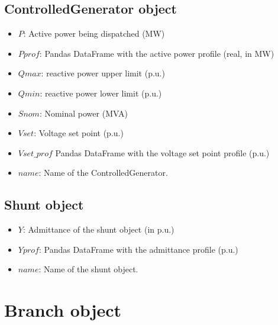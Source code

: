 \documentclass[11pt,fleqn]{book} %
\begin{document}
\subsection{ControlledGenerator object}

\begin{itemize}
	\item $P$: Active power being dispatched (MW)
	\item $Pprof$: Pandas DataFrame with the active power profile (real, in MW)
	\item $Qmax$: reactive power upper limit (p.u.)
	\item $Qmin$: reactive power lower limit (p.u.)
	\item $Snom$: Nominal power (MVA)
	\item $Vset$: Voltage set point (p.u.)
	\item $Vset\_prof$ Pandas DataFrame with the voltage set point profile (p.u.)
	\item $name$: Name of the ControlledGenerator.
\end{itemize}



\subsection{Shunt object}

\begin{itemize}
	\item $Y$: Admittance of the shunt object (in p.u.)
	\item $Yprof$: Pandas DataFrame with the admittance profile (p.u.)
	\item $name$: Name of the shunt object.
\end{itemize}



\section{Branch object}
\end{document}
